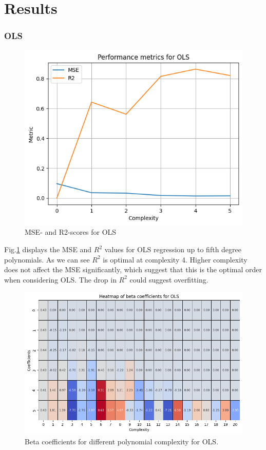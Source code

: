 \documentclass[aps,rmp,reprint,amsmath,amssymb,graphicx,longbibliography]{revtex4-1}
\begin{document}
\section{Results}
\subsubsection{OLS}

\begin{figure}[H]
    \centering
    \includegraphics[width=0.5\linewidth]{Project_1/figures/OLS_MSE_R2.png}
    \caption{MSE- and R2-scores for OLS}
    \label{fig:MSE_R2_OLS}
\end{figure}

Fig.\ref{fig:MSE_R2_OLS} displays the MSE and $R^2$ values for OLS regression up to fifth degree polynomials. As we can see $R^2$ is optimal at complexity 4. Higher complexity does not affect the MSE significantly, which suggest that this is the optimal order when considering OLS. The drop in $R^2$ could suggest overfitting.

\begin{figure}[H]
    \centering
    \includegraphics[width=0.9\linewidth]{Project_1/figures/beta_OLS.png}
    \caption{Beta coefficients for different polynomial complexity for OLS.}
    \label{fig:Beta_OLS}
\end{figure}
\end{document}
